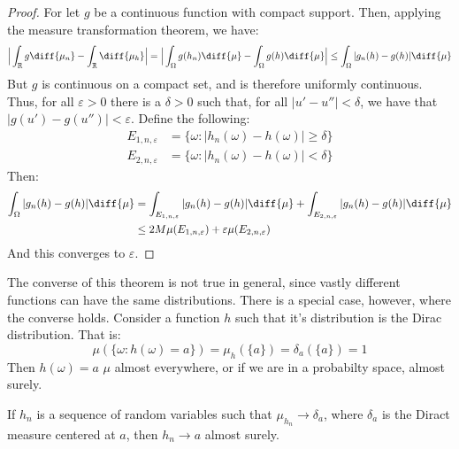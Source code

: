     \begin{proof}
        For let $g$ be a continuous function with compact
        support. Then, applying the measure transformation
        theorem, we have:
        \begin{equation}
            \Big|\int_{\mathbb{R}}g\diff{\mu_{n}}-
                \int_{\mathbb{R}}\diff{\mu_{h}}\Big|
            =\Big|\int_{\Omega}g(h_{n})\diff{\mu}-
                \int_{\Omega}g(h)\diff{\mu}\Big|
            \leq\int_{\Omega}|g_{n}(h)-g(h)|\diff{\mu}
        \end{equation}
        But $g$ is continuous on a compact set, and is
        therefore uniformly continuous. Thus, for all
        $\varepsilon>0$ there is a $\delta>0$ such that, for
        all $|u'-u''|<\delta$, we have that
        $|g(u')-g(u'')|<\varepsilon$. Define the following:
        \begin{align}
            E_{1,n,\varepsilon}
            &=\{\omega:|h_{n}(\omega)-h(\omega)|\geq\delta\}\\
            E_{2,n,\varepsilon}
            &=\{\omega:|h_{n}(\omega)-h(\omega)|<\delta\}
        \end{align}
        Then:
        \begin{align}
            \int_{\Omega}|g_{n}(h)-g(h)|\diff{\mu}
            &=\int_{E_{1,n,\varepsilon}}|g_{n}(h)-g(h)|\diff{\mu}
            +\int_{E_{2,n,\varepsilon}}
                |g_{n}(h)-g(h)|\diff{\mu}\\
            &\leq{2}M\mu(E_{1,n,\varepsilon})+
                \varepsilon\mu(E_{2,n,\varepsilon})
        \end{align}
        And this converges to $\varepsilon$.
    \end{proof}
    The converse of this theorem is not true in general,
    since vastly different functions can have the same
    distributions. There is a special case, however, where the
    converse holds. Consider a function $h$ such that it's
    distribution is the Dirac distribution. That is:
    \begin{equation}
        \mu(\{\omega:h(\omega)=a\})=
        \mu_{h}(\{a\})=\delta_{a}(\{a\})=1
    \end{equation}
    Then $h(\omega)=a$ $\mu$ almost everywhere, or if we are
    in a probabilty space, almost surely.
    \begin{theorem}
        If $h_{n}$ is a sequence of random variables such that
        $\mu_{h_{n}}\rightarrow\delta_{a}$, where $\delta_{a}$
        is the Diract measure centered at $a$, then
        $h_{n}\rightarrow{a}$ almost surely.
    \end{theorem}
